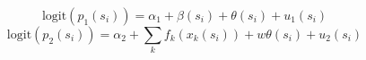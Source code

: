 \documentclass[12pt]{article}
\begin{document}
\begin{linenumbers}
\[
\mathrm{logit}(p_{1}(s_{i})) = \alpha_{1} + \beta(s_{i}) + \theta(s_{i}) + u_{1}(s_{i})
\]
\[
\mathrm{logit}(p_{2}(s_{i})) = \alpha_{2} + \sum_{k}f_{k}(x_{k}(s_{i})) + w \theta(s_{i}) + u_{2}(s_{i})
\]


\end{linenumbers}
\end{document}
